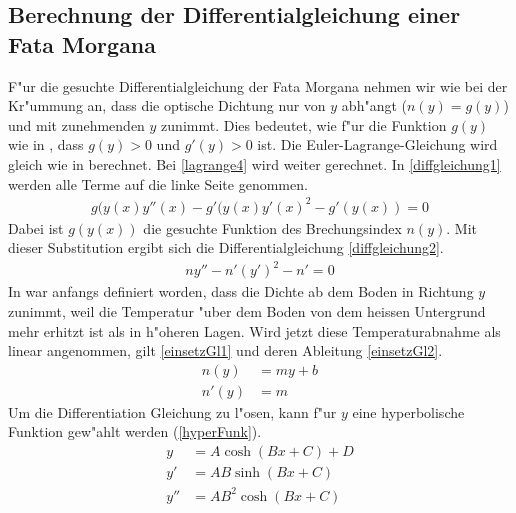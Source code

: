 \subsection{Berechnung der Differentialgleichung einer Fata Morgana \label{sec:diffgleichung}}
F"ur die gesuchte Differentialgleichung der Fata Morgana nehmen wir wie
bei der Kr"ummung an, dass die optische Dichtung nur von $y$ abh"angt
($n(y) = g(y)$) und mit zunehmenden $y$ zunimmt. Dies bedeutet, wie
f"ur die Funktion $g(y)$ wie in , dass $g(y) > 0$
und $g'(y) > 0 $ ist.
Die Euler-Lagrange-Gleichung wird gleich wie in 
berechnet. Bei \eqref{lagrange4} wird weiter gerechnet. In
\eqref{diffgleichung1} werden alle Terme auf die linke Seite genommen.
\begin{align}
	g(y(x) y''(x)-g'(y(x) y'(x)^2 - g'(y(x)) =0 
	\label{diffgleichung1}
\end{align}
Dabei ist $g(y(x))$ die gesuchte Funktion des Brechungsindex $n(y)$. Mit
dieser Substitution ergibt sich die Differentialgleichung
\ref{diffgleichung2}.
\begin{align}
	n y''-n' (y')^2 - n' =0 
	\label{diffgleichung2}
\end{align}
In  war anfangs definiert worden, dass die Dichte ab
dem Boden in Richtung $y$ zunimmt, weil die Temperatur "uber dem Boden von
dem heissen Untergrund mehr erhitzt ist als in h"oheren Lagen. Wird jetzt
diese Temperaturabnahme als linear angenommen, gilt \eqref{einsetzGl1}
und deren Ableitung \eqref{einsetzGl2}.
\begin{align}
	n(y)&=my+b \label{einsetzGl1} \\
	n'(y)&=m \label{einsetzGl2}
\end{align}
Um die Differentiation Gleichung zu l"osen, kann f"ur $y$ eine
hyperbolische Funktion \cite{cosh} gew"ahlt werden (\eqref{hyperFunk}).
\begin{align}
	y&=A\cosh(Bx+C)+D \label{hyperFunk} \\
	y'&= A B \sinh(B x + C) \label{hyperFunkDx} \\
	y''&= A B^2 \cosh(B x + C) \label{hyperFunkD2x}
\end{align}

